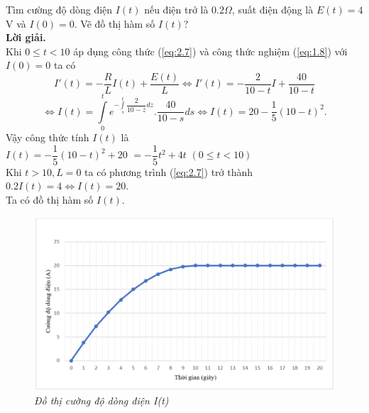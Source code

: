 Tìm cường độ dòng điện $I(t)$ nếu điện trở là $0.2 \Omega$, suất điện động là $E(t)=4$V và $I(0)=0$. Vẽ đồ thị hàm số $I(t)$?\\
\textbf{Lời giải. }\\
Khi $0\le t<10$  áp dụng công thức (\ref{eq:2.7}) và công thức nghiệm (\ref{eq:1.8}) với $I(0)=0$ ta có
$$  {I}'(t)=-\dfrac{R}{L}I(t)+\dfrac{E(t)}{L}\Leftrightarrow I'(t)=-\dfrac{2}{10-t}I+\dfrac{40}{10-t} $$
	$$ \Leftrightarrow I(t)=\int\limits_{0}^{t}{{{e}^{-\int\limits_{s}^{t}{\dfrac{2}{10-z}dz}}}.}\dfrac{40}{10-s}ds\Leftrightarrow I(t)=20-\dfrac{1}{5}{{(10-t)}^{2}}. $$
Vậy công thức tính $I(t)$ là $I(t)=-\dfrac{1}{5}{{(10-t)}^{2}}+20\,\,=-\dfrac{1}{5}{{t}^{2}}+4t\,\,(0\le t<10)$\\
Khi $t >10, L=0$ ta có phương trình (\ref{eq:2.7}) trở thành  $0.2I(t)=4\Leftrightarrow I(t)=20$.\\
Ta có đồ thị hàm số $I(t)$.
\begin{figure}[H]
	\centering
	\includegraphics[scale=0.65]{Images/hinh_2_17.png}
	\caption[Đồ thị cường độ dòng điện I(t)
	]{\itshape\fontsize{13pt}{0pt}\selectfont\centering Đồ thị cường độ dòng điện I(t)}
	\label{hinh2.17}
\end{figure}
